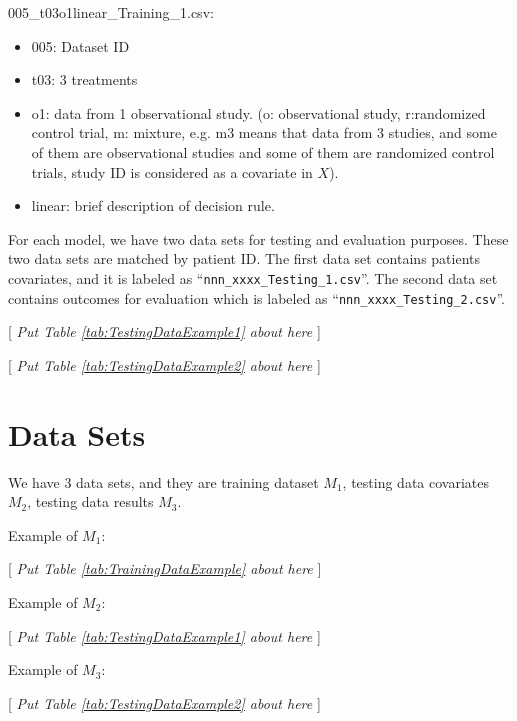\documentclass[12pt]{article}
\begin{document}
005\_t03o1linear\_Training\_1.csv:
\begin{itemize}
	\item 005: Dataset ID
	\item t03: 3 treatments
	\item o1: data from 1 observational study. (o: observational study, r:randomized control trial, m: mixture, e.g. m3 means that data from 3 studies, and some of them are observational studies and some of them are randomized control trials, study ID is considered as a covariate in $X$).
	\item linear: brief description of decision rule.
\end{itemize}







For each model, we have two data sets for testing and evaluation purposes. These two data sets are matched by patient ID.
The first data set contains patients covariates, and it is labeled as ``\verb"nnn_xxxx_Testing_1.csv"''. The second data set contains outcomes for evaluation which is labeled as ``\verb"nnn_xxxx_Testing_2.csv"''.

\begin{center}
	{[ \textsl{Put Table \ref{tab:TestingDataExample1} about here} ]}
\end{center}

\begin{center}
	{[ \textsl{Put Table \ref{tab:TestingDataExample2} about here} ]}
\end{center}


\section{Data Sets} \label{sec.DataSetsExplained}
We have 3 data sets, and they are training dataset $M_1$, testing data covariates $M_2$, testing data results $M_3$.

Example of $M_1$:
\begin{center}
{[ \textsl{Put Table \ref{tab:TrainingDataExample} about here} ]}
\end{center}

Example of $M_2$:
\begin{center}
{[ \textsl{Put Table \ref{tab:TestingDataExample1} about here} ]}
\end{center}

Example of $M_3$:
\begin{center}
{[ \textsl{Put Table \ref{tab:TestingDataExample2} about here} ]}
\end{center}
\end{document}
